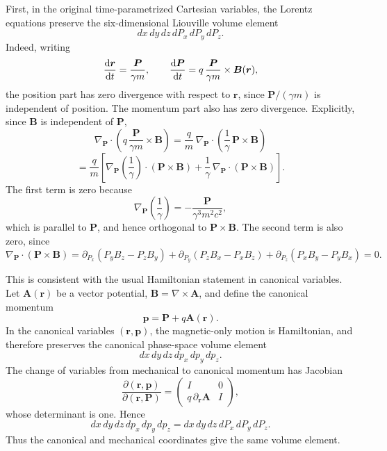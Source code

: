 First, in the original time-parametrized Cartesian variables, the Lorentz
equations preserve the six-dimensional Liouville volume element
\[
dx\,dy\,dz\,dP_x\,dP_y\,dP_z.
\]
Indeed, writing
\[
\frac{\text{d} {\bm r}}{\text{d} {t}}=\frac{\bm P}{\gamma m},
\qquad
\frac{\text{d} {\bm P}}{\text{d} {t}}=q\,\frac{\bm P}{\gamma m}\times\bm B(\bm r),
\]
the position part has zero divergence with respect to \(\bm r\), since
\(\bm P/(\gamma m)\) is independent of position.  The momentum part also has
zero divergence.  Explicitly, since \(\bm B\) is independent of \(\bm P\),
\[
\nabla_{\bm P}\cdot\left(q\,\frac{\bm P}{\gamma m}\times\bm B\right)
=\frac{q}{m}\,
 \nabla_{\bm P}\cdot\left(\frac{1}{\gamma}\,\bm P\times\bm B\right)
\]
\[
=\frac{q}{m}\left[
\nabla_{\bm P}\!\left(\frac{1}{\gamma}\right)\cdot(\bm P\times\bm B)
+\frac{1}{\gamma}\,\nabla_{\bm P}\cdot(\bm P\times\bm B)
\right].
\]
The first term is zero because
\[
\nabla_{\bm P}\!\left(\frac{1}{\gamma}\right)
=-\frac{\bm P}{\gamma^3 m^2c^2},
\]
which is parallel to \(\bm P\), and hence orthogonal to
\(\bm P\times\bm B\).  The second term is also zero, since
\[
\nabla_{\bm P}\cdot(\bm P\times\bm B)
=\partial_{P_x}(P_yB_z-P_zB_y)
+\partial_{P_y}(P_zB_x-P_xB_z)
+\partial_{P_z}(P_xB_y-P_yB_x)
=0.
\]

This is consistent with the usual Hamiltonian statement in canonical
variables.  Let \(\bm A(\bm r)\) be a vector potential, \(\bm B=\nabla\times
\bm A\), and define the canonical momentum
\[
\bm p=\bm P+q\bm A(\bm r).
\]
In the canonical variables \((\bm r,\bm p)\), the magnetic-only motion is
Hamiltonian, and therefore preserves the canonical phase-space volume element
\[
dx\,dy\,dz\,dp_x\,dp_y\,dp_z.
\]
The change of variables from mechanical to canonical momentum has Jacobian
\[
\frac{\partial(\bm r,\bm p)}{\partial(\bm r,\bm P)}
=
\begin{pmatrix}
I & 0\\
q\,\partial_{\bm r}\bm A & I
\end{pmatrix},
\]
whose determinant is one.  Hence
\[
dx\,dy\,dz\,dp_x\,dp_y\,dp_z
=
dx\,dy\,dz\,dP_x\,dP_y\,dP_z.
\]
Thus the canonical and mechanical coordinates give the same volume element.

